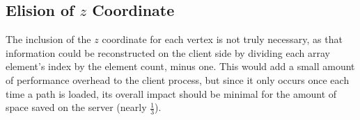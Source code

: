\subsection{Elision of $z$ Coordinate}
    The inclusion of the $z$ coordinate for each vertex is not truly necessary, as that information could be reconstructed on the client side by dividing each array element's index by the element count, minus one. This would add a small amount of performance overhead to the client process, but since it only occurs once each time a path is loaded, its overall impact should be minimal for the amount of space saved on the server (nearly $\frac{1}{3}$).

